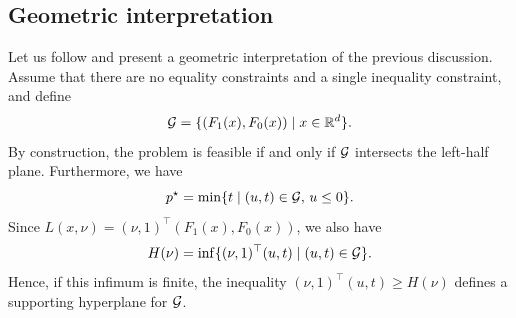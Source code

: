  
 
     \subsection{Geometric interpretation}
     \label{sec:geometric-interpretation}
 
     Let us follow \cite[Section~5.3]{boydConvex2023} and present a geometric interpretation of the previous discussion.
     Assume that there are no equality constraints and a single inequality constraint, and define
     \begin{equation}
         \mathcal{G} = \{ (F_1(x), F_0(x)) \mid x\in \mathbb{R}^d\}.
     \end{equation}
     By construction, the problem is feasible if and only if $\mathcal{G}$ intersects the left-half plane.
     Furthermore, we have
     \begin{equation}
         p^\star  = \min\{ t \mid (u,t)\in \mathcal{G},\, u\le 0\}.
     \end{equation}
     Since $L(x,\nu) = (\nu,1)^\top (F_1(x),F_0(x))$, we also have
     \begin{equation}
         H(\nu) = \inf \{  (\nu,1)^\top (u,t) \mid (u,t)\in \mathcal{G} \}.
     \end{equation}
     Hence, if this infimum is finite, the inequality $(\nu,1)^\top (u,t)\ge H(\nu)$ defines a supporting hyperplane for $\mathcal{G}$.
 
